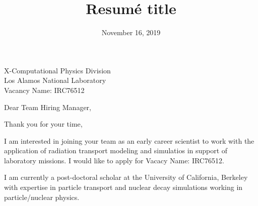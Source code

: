 \documentclass[11pt]{moderncv}        %
\title{Resumé title}                               %
\begin{document}
{X-Computational Physics Division\\Los Alamos National Laboratory\\Vacancy Name: IRC76512}
\date{November 16, 2019}
\opening{Dear Team Hiring Manager,}
\closing{Thank you for your time,}
\makelettertitle

I am interested in joining your team as an early career scientist to work with
the application of radiation transport modeling and simulatios in support of
laboratory missions. I would like to apply for Vacacy Name: IRC76512.

I am currently a post-doctoral scholar at the University of California,
Berkeley with expertise in particle transport and nuclear decay simulations
working in particle/nuclear physics.


\end{document}

